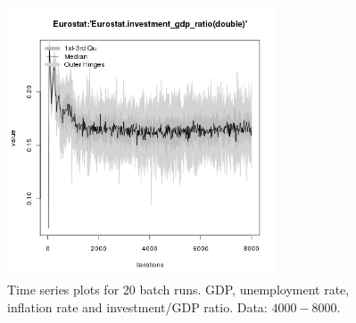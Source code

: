 \begin{figure}[ht!]
\begin{minipage}{17cm}
\includegraphics[width=8cm]{./transient/tax_0.08/Eurostat-investment_gdp_ratio.png}
\end{minipage}
\caption{Time series plots for 20 batch runs. GDP, unemployment rate, inflation rate and investment/GDP ratio. Data: $4000-8000$.}
\label{Figure: transient time}
\end{figure}


